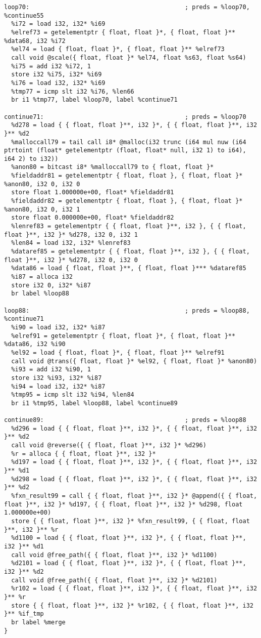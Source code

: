 \documentclass[main.tex]{subfiles}
\begin{document}
{\begin{lstlisting}
loop70:                                           ; preds = %loop70, %continue55
  %i72 = load i32, i32* %i69
  %elref73 = getelementptr { float, float }*, { float, float }** %data68, i32 %i72
  %el74 = load { float, float }*, { float, float }** %elref73
  call void @scale({ float, float }* %el74, float %s63, float %s64)
  %i75 = add i32 %i72, 1
  store i32 %i75, i32* %i69
  %i76 = load i32, i32* %i69
  %tmp77 = icmp slt i32 %i76, %len66
  br i1 %tmp77, label %loop70, label %continue71

continue71:                                       ; preds = %loop70
  %d278 = load { { float, float }**, i32 }*, { { float, float }**, i32 }** %d2
  %malloccall79 = tail call i8* @malloc(i32 trunc (i64 mul nuw (i64 ptrtoint (float* getelementptr (float, float* null, i32 1) to i64), i64 2) to i32))
  %anon80 = bitcast i8* %malloccall79 to { float, float }*
  %fieldaddr81 = getelementptr { float, float }, { float, float }* %anon80, i32 0, i32 0
  store float 1.000000e+00, float* %fieldaddr81
  %fieldaddr82 = getelementptr { float, float }, { float, float }* %anon80, i32 0, i32 1
  store float 0.000000e+00, float* %fieldaddr82
  %lenref83 = getelementptr { { float, float }**, i32 }, { { float, float }**, i32 }* %d278, i32 0, i32 1
  %len84 = load i32, i32* %lenref83
  %dataref85 = getelementptr { { float, float }**, i32 }, { { float, float }**, i32 }* %d278, i32 0, i32 0
  %data86 = load { float, float }**, { float, float }*** %dataref85
  %i87 = alloca i32
  store i32 0, i32* %i87
  br label %loop88

loop88:                                           ; preds = %loop88, %continue71
  %i90 = load i32, i32* %i87
  %elref91 = getelementptr { float, float }*, { float, float }** %data86, i32 %i90
  %el92 = load { float, float }*, { float, float }** %elref91
  call void @trans({ float, float }* %el92, { float, float }* %anon80)
  %i93 = add i32 %i90, 1
  store i32 %i93, i32* %i87
  %i94 = load i32, i32* %i87
  %tmp95 = icmp slt i32 %i94, %len84
  br i1 %tmp95, label %loop88, label %continue89

continue89:                                       ; preds = %loop88
  %d296 = load { { float, float }**, i32 }*, { { float, float }**, i32 }** %d2
  call void @reverse({ { float, float }**, i32 }* %d296)
  %r = alloca { { float, float }**, i32 }*
  %d197 = load { { float, float }**, i32 }*, { { float, float }**, i32 }** %d1
  %d298 = load { { float, float }**, i32 }*, { { float, float }**, i32 }** %d2
  %fxn_result99 = call { { float, float }**, i32 }* @append({ { float, float }**, i32 }* %d197, { { float, float }**, i32 }* %d298, float 1.000000e+00)
  store { { float, float }**, i32 }* %fxn_result99, { { float, float }**, i32 }** %r
  %d1100 = load { { float, float }**, i32 }*, { { float, float }**, i32 }** %d1
  call void @free_path({ { float, float }**, i32 }* %d1100)
  %d2101 = load { { float, float }**, i32 }*, { { float, float }**, i32 }** %d2
  call void @free_path({ { float, float }**, i32 }* %d2101)
  %r102 = load { { float, float }**, i32 }*, { { float, float }**, i32 }** %r
  store { { float, float }**, i32 }* %r102, { { float, float }**, i32 }** %if_tmp
  br label %merge
}


\end{lstlisting}}
\end{document}
